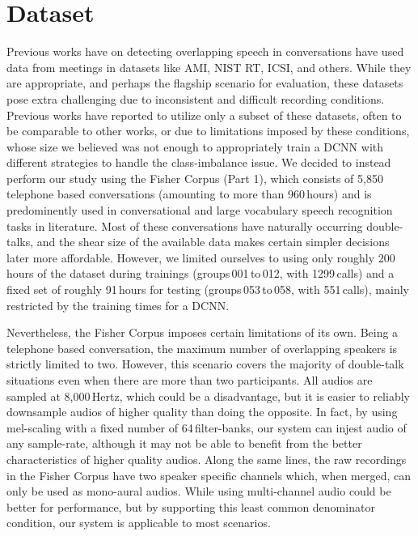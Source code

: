 \documentclass[a4paper]{article}
\begin{document}
\section{Dataset} \label{sec:dataset}
Previous works have on detecting overlapping speech in conversations have used data from meetings in datasets like AMI, NIST RT, ICSI, and others.  %
While they are appropriate, and perhaps the flagship scenario for evaluation,
these datasets pose extra challenging due to inconsistent and difficult recording conditions.
Previous works have reported to utilize only a subset of these datasets,
often to be comparable to other works,  %
or due to limitations imposed by these conditions,
whose size we believed was not enough to appropriately train a DCNN with different strategies to handle the class-imbalance issue.
We decided to instead perform our study using the Fisher Corpus (Part 1),  %
which consists of 5,850 telephone based conversations (amounting to more than 960\,hours) and is predominently used in conversational and large vocabulary speech recognition tasks in literature.  %
Most of these conversations have naturally occurring double-talks,
and the shear size of the available data makes certain simpler decisions later more affordable.
However, we limited ourselves to using only roughly 200\,hours of the dataset during trainings
(groups\,001\,to\,012, with 1299\,calls) and a fixed set of roughly 91\,hours for testing
(groups\,053\,to\,058, with 551\,calls),
mainly restricted by the training times for a DCNN.

Nevertheless, the Fisher Corpus imposes certain limitations of its own.
Being a telephone based conversation, the maximum number of overlapping speakers is strictly limited to two.
However, this scenario covers the majority of double-talk situations even when there are more than two participants.  %
All audios are sampled at 8,000\,Hertz, which could be a disadvantage,
but it is easier to reliably downsample audios of higher quality than doing the opposite.
In fact, by using mel-scaling with a fixed number of 64\,filter-banks,
our system can injest audio of any sample-rate,
although it may not be able to benefit from the better characteristics of higher quality audios.
Along the same lines, the raw recordings in the Fisher Corpus have two speaker specific channels which, when merged,
can only be used as mono-aural audios.
While using multi-channel audio could be better for performance,
but by supporting this least common denominator condition,
our system is applicable to most scenarios.
\end{document}
